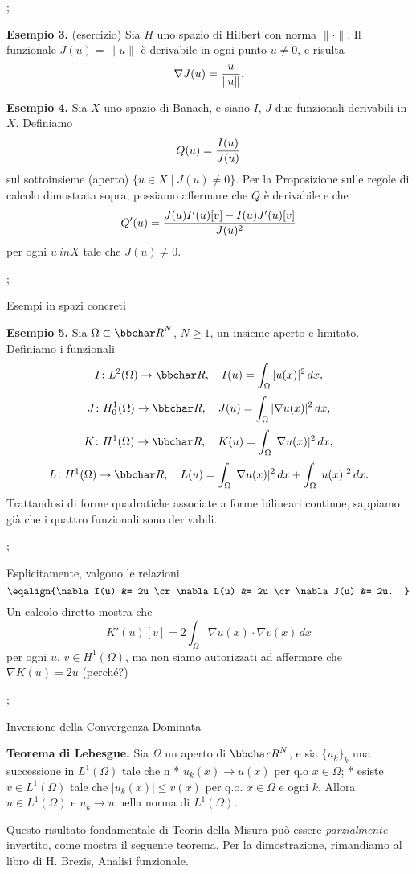 \pg;

{\bf Esempio 3.} (esercizio) Sia $H$ uno spazio di Hilbert con norma $\| \cdot
\|$. Il funzionale $J(u)=\|u\|$ \`e derivabile in ogni punto $u \neq
0$, e risulta
$$
\nabla J(u) = {u \over \|u\|}.
$$

\medskip

{\bf Esempio 4.} Sia $X$ uno spazio di Banach, e siano $I$, $J$ due
funzionali derivabili in $X$. Definiamo
$$
Q(u) = {I(u) \over J(u)}
$$
sul sottoinsieme (aperto) $\{u \in  X \mid J(u) \neq 0\}$. Per la
Proposizione sulle regole di calcolo dimostrata sopra, possiamo
affermare che $Q$ \`e derivabile e che
$$
Q'(u) = {J(u) I'(u)[v] - I(u) J'(u)[v] \over J(u)^2}
$$
per ogni $u\ in X$ tale che $J(u) \neq 0$.

\pg;

\sec Esempi in spazi concreti

{\bf Esempio 5.} Sia $\Omega \subset \R^N$, $N \geq 1$, un insieme
aperto e limitato. Definiamo i funzionali
$$
I \colon L^2(\Omega) \to \R, \quad I(u) = \int_\Omega |u(x)|^2 \, dx,
$$
$$
J \colon H_0^1(\Omega) \to \R, \quad J(u) = \int_\Omega |\nabla
u(x)|^2 \, dx,
$$
$$
K \colon H^1(\Omega) \to \R, \quad K(u) = \int_\Omega |\nabla
u(x)|^2 \, dx,
$$
$$
L \colon H^1(\Omega) \to \R, \quad L(u) = \int_\Omega |\nabla
u(x)|^2 \, dx + \int_\Omega |u(x)|^2 \, dx.
$$
Trattandosi di forme quadratiche associate a forme bilineari continue,
sappiamo gi\`a che i quattro funzionali sono derivabili.

\pg;

Esplicitamente, valgono le relazioni
$$
\eqalign{%
\nabla I(u) &= 2u \cr
\nabla L(u) &= 2u \cr
\nabla J(u) &= 2u.
}
$$
Un
calcolo diretto mostra che
$$
K'(u)[v] = 2 \int_\Omega \nabla u(x) \cdot \nabla v(x) \, dx
$$
per ogni $u$, $v \in H^1(\Omega)$, ma non siamo autorizzati ad
affermare che $\nabla K(u)=2u$ (perch\'e?)

\pg;

\sec Inversione della Convergenza Dominata

{\bf Teorema di Lebesgue.} Sia $\Omega$ un aperto di $\R^N$, e sia
$\{u_k\}_k$ una successione in $L^1(\Omega)$ tale che
\begitems
\style n
* $u_k(x) \to u(x)$ per q.o $x \in \Omega$;
* esiste $v \in L^1(\Omega)$ tale che $|u_k(x)| \leq v(x)$ per q.o. $x
\in \Omega$ e ogni $k$.
\enditems
Allora $u \in L^1(\Omega)$ e $u_k \to u$ nella norma di $L^1(\Omega)$.

\bigskip

Questo risultato fondamentale di Teoria della Misura pu\`o essere {\em
parzialmente} invertito, come mostra il seguente teorema. Per la
dimostrazione, rimandiamo al libro di H. Brezis, Analisi funzionale.

